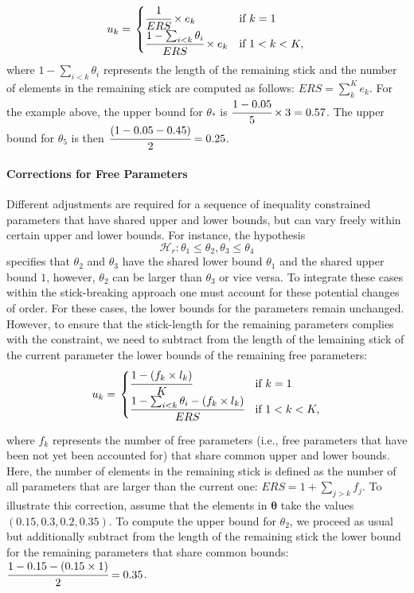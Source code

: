 \begin{appendix}
\begin{align}
  u_k = \left.
  \begin{cases}
      \cfrac{1}{ERS} \times e_k & \text{if } k = 1 \\
      \cfrac{1 - \sum_{i < k} \theta_i}{ERS} \times e_k & \text{if } 1 < k < K,
  \end{cases}
    \right.
\end{align} where \(1 - \sum_{i < k} \theta_i\) represents the length of
the remaining stick and the number of elements in the remaining stick
are computed as follows: \(ERS = \sum_k^{K} e_k\). For the example
above, the upper bound for \(\theta_*\) is
\(\cfrac{1 - 0.05}{5} \times 3 = 0.57\). The upper bound for
\(\theta_5\) is then \(\cfrac{(1 - 0.05 - 0.45)}{2} = 0.25\).

\hypertarget{corrections-for-free-parameters}{%
\paragraph{Corrections for Free
Parameters}\label{corrections-for-free-parameters}}

Different adjustments are required for a sequence of inequality
constrained parameters that have shared upper and lower bounds, but can
vary freely within certain upper and lower bounds. For instance, the
hypothesis
\[\mathcal{H}_r: \theta_1 \leq \theta_2, \theta_3 \leq \theta_4\]
specifies that \(\theta_2\) and \(\theta_3\) have the shared lower bound
\(\theta_1\) and the shared upper bound \(1\), however, \(\theta_2\) can
be larger than \(\theta_3\) or vice versa. To integrate these cases
within the stick-breaking approach one must account for these potential
changes of order. For these cases, the lower bounds for the parameters
remain unchanged. However, to ensure that the stick-length for the
remaining parameters complies with the constraint, we need to subtract
from the length of the lemaining stick of the current parameter the
lower bounds of the remaining free parameters: \begin{align}
  u_k = \left.
  \begin{cases}
      \cfrac{1 - (f_k \times l_k)}{K} & \text{if } k = 1 \\
      \cfrac{1 - \sum_{i < k} \theta_i - (f_k \times l_k)}{ERS} & \text{if } 1 < k < K,
  \end{cases}
    \right.
\end{align}

where \(f_k\) represents the number of free parameters (i.e., free
parameters that have been not yet been accounted for) that share common
upper and lower bounds. Here, the number of elements in the remaining
stick is defined as the number of all parameters that are larger than
the current one: \(ERS = 1 + \sum_{j > k} f_j\). To illustrate this
correction, assume that the elements in \(\boldsymbol{\theta}\) take the
values \((0.15, 0.3, 0.2, 0.35)\). To compute the upper bound for
\(\theta_2\), we proceed as usual but additionally subtract from the
length of the remaining stick the lower bound for the remaining
parameters that share common bounds:
\(\cfrac{1 - 0.15 - (0.15 \times 1)}{2} = 0.35\).


\end{appendix}
